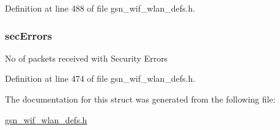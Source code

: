 Definition at line 488 of file gsn\_\-wif\_\-wlan\_\-defs.h.

\hypertarget{a00419_a2291caa4b52ab4dea6c361d80b0f6c26}{
\subsubsection[{secErrors}]{ {\bf secErrors}}}
\label{a00419_a2291caa4b52ab4dea6c361d80b0f6c26}
No of packets received with Security Errors 

Definition at line 474 of file gsn\_\-wif\_\-wlan\_\-defs.h.



The documentation for this struct was generated from the following file:\begin{DoxyCompactItemize}
\item 
\hyperlink{a00613}{gsn\_\-wif\_\-wlan\_\-defs.h}\end{DoxyCompactItemize}
